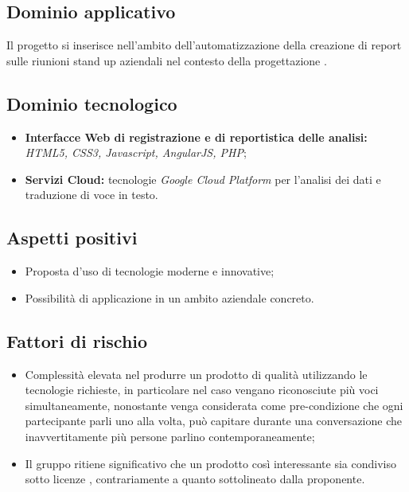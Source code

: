 \documentclass[openany,12pt,a4paper]{report}
\begin{document}
	\subsection{Dominio applicativo}

	Il progetto si inserisce nell'ambito dell'automatizzazione della creazione di report sulle riunioni stand up aziendali nel contesto della progettazione .

	\subsection{Dominio tecnologico}

	\begin{itemize}
		\item \textbf{Interfacce Web di registrazione e di reportistica delle analisi:} \textit{HTML5, CSS3, Javascript, AngularJS, PHP};

		\item \textbf{Servizi Cloud:} tecnologie \textit{Google Cloud Platform} per l’analisi dei dati e traduzione di voce in testo.
	\end{itemize}

	\subsection{Aspetti positivi}

	\begin{itemize}
		\item Proposta d'uso di tecnologie moderne e innovative;

		\item Possibilità di applicazione in un ambito aziendale concreto.
	\end{itemize}

	\subsection{Fattori di rischio}

	\begin{itemize}
		\item Complessità elevata nel produrre un prodotto di qualità utilizzando le tecnologie richieste, in particolare nel caso vengano riconosciute più voci simultaneamente, nonostante venga considerata come pre-condizione che ogni partecipante parli uno alla volta, può capitare durante una conversazione che inavvertitamente più persone parlino contemporaneamente;

		\item Il gruppo ritiene significativo che un prodotto così interessante sia condiviso sotto licenze , contrariamente a quanto sottolineato dalla proponente.
	\end{itemize}
\end{document}
